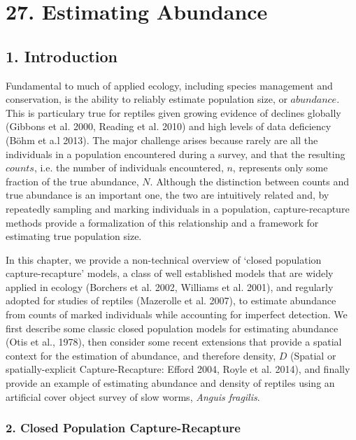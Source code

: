 \documentclass{book}
\begin{document}
\chapter*{27. Estimating Abundance\\
          }

\section*{1. Introduction}

Fundamental to much of applied ecology, including species management
and conservation, is the ability to reliably estimate population size,
or $abundance$. This is particulary true for reptiles given growing
evidence of declines globally (Gibbons et al. 2000, Reading et
al. 2010) and high levels of data deficiency (B{\"o}hm et a.l 2013). The
major challenge arises because rarely are all the individuals in a
population encountered during a survey, and that the
resulting $counts$, i.e. the number of individuals encountered, $n$,
represents only some fraction of the true abundance, $N$. Although the
distinction between counts and true abundance is an important one, the
two are intuitively related and, by repeatedly sampling and marking
individuals in a population, capture-recapture methods provide a
formalization of this relationship and a framework for estimating true
population size.

In this chapter, we provide a non-technical overview of `closed
population capture-recapture' models, a class of well established
models that are widely applied in ecology (Borchers et al. 2002,
Williams et al. 2001), and regularly adopted for studies of reptiles
(Mazerolle et al. 2007), to estimate abundance from counts of marked
individuals while accounting for imperfect detection. We first describe
some classic closed population models for estimating abundance (Otis
et al., 1978), then consider some recent extensions that provide a
spatial context for the estimation of abundance, and therefore
density, $D$ (Spatial or spatially-explicit Capture-Recapture: Efford
2004, Royle et al. 2014), and finally provide an example of estimating
abundance and density of reptiles using an artificial cover object
survey of slow worms, \textit{Anguis fragilis}.

\subsection*{2. Closed Population Capture-Recapture}
\end{document}
